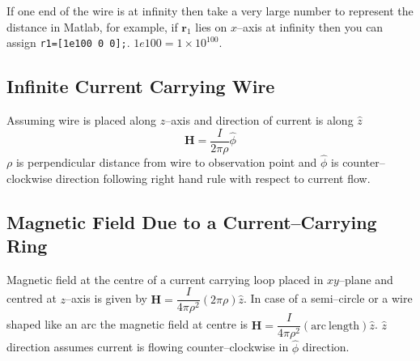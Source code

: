 \documentclass[12pt,a4paper]{article}
\begin{document}
If one end of the wire is at infinity then take a very large number to represent the distance in Matlab, for example, if $\textbf{r}_1$ lies on $x$--axis at infinity then you can assign \verb|r1=[1e100 0 0];|. $1e100=1\times 10^{100}$.
\subsection{Infinite Current Carrying Wire}
Assuming wire is placed along $z$--axis and direction of current is along $\hat z$
\begin{equation}
\textbf{H}=\dfrac{I}{2\pi\rho}\hat\phi
\end{equation}
$\rho$ is perpendicular distance from wire to observation point and $\hat\phi$ is counter--clockwise direction following right hand rule with respect to current flow.
\subsection{Magnetic Field Due to a Current--Carrying Ring}
Magnetic field at the centre of a current carrying loop placed in $xy$--plane and centred at $z$--axis is given by $\textbf{H}=\dfrac{I}{4\pi\rho^2}(2\pi\rho)\hat z$. In case of a semi--circle or a wire shaped like an arc the magnetic field at centre is $\textbf{H}=\dfrac{I}{4\pi\rho^2}(\mathrm{arc~length})\hat z$. $\hat z$ direction assumes current is flowing counter--clockwise in $\hat\phi$ direction.


\end{document}
